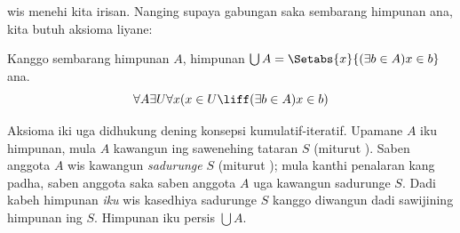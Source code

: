 \documentclass[../../../include/open-logic-section]{subfiles}
\begin{document}

 wis menehi kita
irisan. Nanging supaya gabungan saka sembarang himpunan ana,
kita butuh aksioma liyane:

\begin{axiom}[Gabungan] Kanggo sembarang himpunan $A$, himpunan
$\bigcup A = \Setabs{x}{(\exists b \in A) x \in b}$ ana.
\[
	\forall A \exists U \forall x(x \in U \liff (\exists b \in A)x \in b)
\]
\end{axiom}

Aksioma iki uga didhukung dening konsepsi kumulatif-iteratif.
Upamane $A$ iku himpunan, mula $A$ kawangun ing sawenehing
tataran $S$ (miturut \stageshier). Saben anggota $A$ wis
kawangun \emph{sadurunge} $S$ (miturut \stagesacc); mula
kanthi penalaran kang padha, saben anggota saka saben
anggota $A$ uga kawangun sadurunge $S$. Dadi kabeh
himpunan \emph{iku} wis kasedhiya sadurunge $S$ kanggo
diwangun dadi sawijining himpunan ing $S$. Himpunan iku
persis $\bigcup A$.
\end{document}
